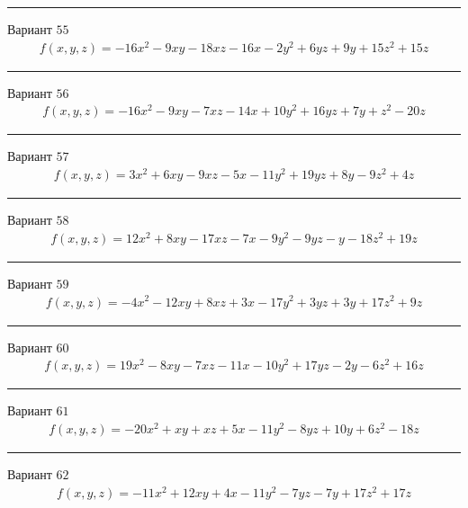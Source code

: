 \documentclass[11pt]{report}
\begin{document}
\begin{center}
\noindent\rule{8cm}{0.4pt}
\end{center}
Вариант $55$
\begin{align*}
    f(x, y, z) = - 16 x^{2} - 9 x y - 18 x z - 16 x - 2 y^{2} + 6 y z + 9 y + 15 z^{2} + 15 z
\end{align*}
\begin{center}
\noindent\rule{8cm}{0.4pt}
\end{center}
Вариант $56$
\begin{align*}
    f(x, y, z) = - 16 x^{2} - 9 x y - 7 x z - 14 x + 10 y^{2} + 16 y z + 7 y + z^{2} - 20 z
\end{align*}
\begin{center}
\noindent\rule{8cm}{0.4pt}
\end{center}
Вариант $57$
\begin{align*}
    f(x, y, z) = 3 x^{2} + 6 x y - 9 x z - 5 x - 11 y^{2} + 19 y z + 8 y - 9 z^{2} + 4 z
\end{align*}
\begin{center}
\noindent\rule{8cm}{0.4pt}
\end{center}
Вариант $58$
\begin{align*}
    f(x, y, z) = 12 x^{2} + 8 x y - 17 x z - 7 x - 9 y^{2} - 9 y z - y - 18 z^{2} + 19 z
\end{align*}
\begin{center}
\noindent\rule{8cm}{0.4pt}
\end{center}
Вариант $59$
\begin{align*}
    f(x, y, z) = - 4 x^{2} - 12 x y + 8 x z + 3 x - 17 y^{2} + 3 y z + 3 y + 17 z^{2} + 9 z
\end{align*}
\begin{center}
\noindent\rule{8cm}{0.4pt}
\end{center}
Вариант $60$
\begin{align*}
    f(x, y, z) = 19 x^{2} - 8 x y - 7 x z - 11 x - 10 y^{2} + 17 y z - 2 y - 6 z^{2} + 16 z
\end{align*}
\begin{center}
\noindent\rule{8cm}{0.4pt}
\end{center}
Вариант $61$
\begin{align*}
    f(x, y, z) = - 20 x^{2} + x y + x z + 5 x - 11 y^{2} - 8 y z + 10 y + 6 z^{2} - 18 z
\end{align*}
\begin{center}
\noindent\rule{8cm}{0.4pt}
\end{center}
Вариант $62$
\begin{align*}
    f(x, y, z) = - 11 x^{2} + 12 x y + 4 x - 11 y^{2} - 7 y z - 7 y + 17 z^{2} + 17 z
\end{align*}
\end{document}
